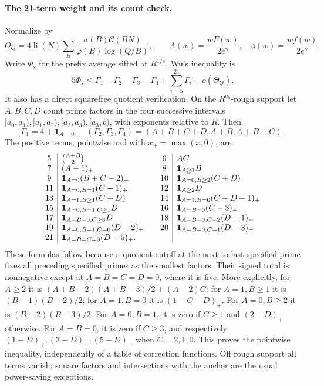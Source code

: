 \documentclass[11pt]{article}
\begin{document}
\paragraph{The 21-term weight and its count check.}
Normalize by
\[
 \Theta_Q=4\operatorname{li}(N)
   \sum_B\frac{\sigma(B)\mathcal C(BN)}
                 {\varphi(B)\log(Q/B)},\qquad
 A(w)=\frac{wF(w)}{2e^\gamma},\quad
 \mathfrak a(w)=\frac{wf(w)}{2e^\gamma}.
\]
Write $\Phi_s$ for the prefix average sifted at $R^{1/s}$.
Wu's inequality is
\[
 5\Phi_s\le\Gamma_1-\Gamma_2-\Gamma_3-\Gamma_4
                       +\sum_{i=5}^{21}\Gamma_i+o(\Theta_Q).
\]
It also has a direct squarefree quotient verification.  On the
$R^{a_0}$-rough support let $A,B,C,D$ count prime factors in the
four successive intervals $[a_0,a_1),[a_1,a_2),[a_2,a_3),[a_3,b)$,
with exponents relative to $R$.  Then
\[
 \Gamma_1=4+\mathbf1_{A=0},\quad
 (\Gamma_2,\Gamma_3,\Gamma_4)=(A+B+C+D,A+B,A+B+C).
\]
The positive terms, pointwise and with $x_+=\max(x,0)$, are
\[
\begin{array}{c|l@{\qquad}c|l}
5&\binom{A+B}{2}&6&AC\\
7&(A-1)_+&8&\mathbf1_{A\ge1}B\\
9&\mathbf1_{A=0}(B+C-2)_+&10&\mathbf1_{A=0,B\ge2}(C+D)\\
11&\mathbf1_{A=0,B=1}(C-1)_+&12&\mathbf1_{A\ge2}D\\
13&\mathbf1_{A=1,B\ge1}(C+D)&14&\mathbf1_{A=1,B=0}(C+D-1)_+\\
15&\mathbf1_{A=0,B=1,C\ge1}D&16&\mathbf1_{A=B=0}(C-3)_+\\
17&\mathbf1_{A=B=0,C\ge3}D&18&\mathbf1_{A=B=0,C=2}(D-1)_+\\
19&\mathbf1_{A=0,B=1,C=0}(D-2)_+&20&\mathbf1_{A=B=0,C=1}(D-3)_+\\
21&\mathbf1_{A=B=C=0}(D-5)_+.&&
\end{array}
\]
These formulas follow because a quotient cutoff at the next-to-last
specified prime fixes all preceding specified primes as the smallest
factors.  Their signed total is nonnegative except at $A=B=C=D=0$,
where it is five.  More explicitly, for $A\ge2$ it is
$(A+B-2)(A+B-3)/2+(A-2)C$; for $A=1,B\ge1$ it is
$(B-1)(B-2)/2$; for $A=1,B=0$ it is $(1-C-D)_+$.
For $A=0,B\ge2$ it is $(B-2)(B-3)/2$.
For $A=0,B=1$, it is zero if $C\ge1$ and $(2-D)_+$ otherwise.
For $A=B=0$, it is zero if $C\ge3$, and respectively
$(1-D)_+,(3-D)_+,(5-D)_+$ when $C=2,1,0$.
This proves the pointwise inequality, independently of a table of
correction functions.  Off rough support all terms vanish; square
factors and intersections with the anchor are the usual power-saving
exceptions.
\end{document}
